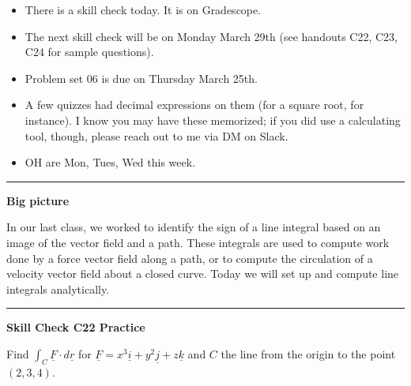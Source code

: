 \documentclass[12pt,letterpaper,noanswers]{exam}
\newcommand{\mb}[1]{\underline{#1}}
\begin{document}
 \pdfpageheight 11in 
  \pdfpagewidth 8.5in





\begin{itemize}
\itemsep0em
\item There is a skill check today.  It is on Gradescope.
\item The next skill check will be on Monday March 29th (see handouts C22, C23, C24 for sample questions).
\item Problem set 06 is due on Thursday March 25th.
\item A few quizzes had decimal expressions on them (for a square root, for instance).  I know you may have these memorized; if you did use a calculating tool, though, please reach out to me via DM on Slack.
\item OH are Mon, Tues, Wed this week.
\end{itemize}

\hrule
\vspace{0.2cm}


\noindent\textbf{Big picture}

In our last class, we worked to identify the sign of a line integral based on an image of the vector field and a path.  These integrals are used to compute work done by a force vector field along a path, or to compute the circulation of a velocity vector field about a closed curve.  Today we will set up and compute line integrals analytically. 

\vspace{0.2cm}
\hrule
\vspace{0.2cm}
\noindent\textbf{Skill Check C22 Practice}
\begin{questions}
\question Find $\displaystyle\int_C \mb F\cdot d\mb r$ for $\mb F = x^3\mb i + y^2\mb j + z\mb k$ and $C$ the line from the origin to the point $(2,3,4)$.

\end{questions}
\end{document}

